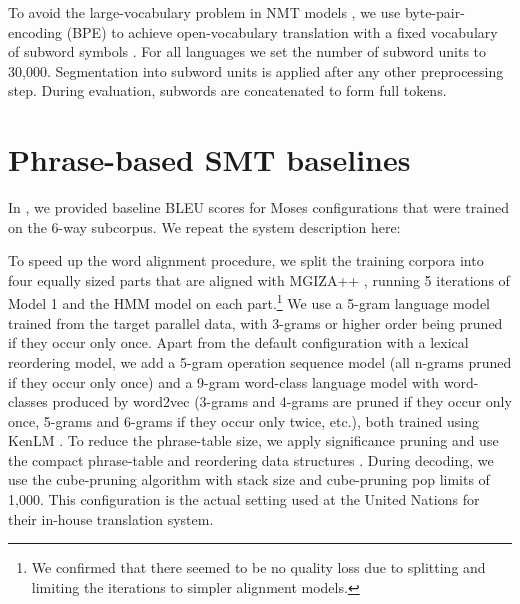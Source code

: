 \documentclass[11pt]{article}
\begin{document}
To avoid the large-vocabulary problem in NMT models \cite{44929}, we use byte-pair-encoding (BPE) to achieve open-vocabulary translation with a fixed vocabulary of subword symbols \cite{DBLP:journals/corr/SennrichHB15}. For all languages we set the number of subword units to 30,000. Segmentation into subword units is applied after any other preprocessing step. During evaluation, subwords are concatenated to form full tokens. 

\section{Phrase-based SMT baselines}
\label{pbmtbaselines}
In , we provided baseline BLEU scores for Moses \cite{Koehn:2007:MOS:1557769.1557821} configurations that were trained on the 6-way subcorpus. We repeat the system description here:

To speed up the word alignment procedure, we split the training corpora into four equally sized parts that are aligned with MGIZA++ \cite{Gao:2008:PIW:1622110.1622119}, running 5 iterations of Model 1 and the HMM model on each part.\footnote{We confirmed that there seemed to be no quality loss due to splitting and limiting the iterations to simpler alignment models.}
We use a 5-gram language model trained from the target parallel data, with 3-grams or higher order being pruned if they occur only once. Apart from the default configuration with a lexical reordering model, we add a 5-gram operation sequence model \cite{conf/acl/DurraniFSHK13} (all n-grams pruned if they occur only once) and a 9-gram word-class language model with word-classes produced by word2vec \cite{journals/corr/abs-1301-3781} (3-grams and 4-grams are pruned if they occur only once, 5-grams and 6-grams if they occur only twice, etc.), both trained using KenLM \cite{Heafield-estimate}.  To reduce the phrase-table size, we apply significance pruning \cite{Johnson07improvingtranslation} and use the compact phrase-table and reordering data structures \cite{junczys_mtm_2012}.
During decoding, we use the cube-pruning algorithm with stack size and cube-pruning pop limits of 1,000. This configuration is the actual setting used at the United Nations for their in-house translation system.
\end{document}

